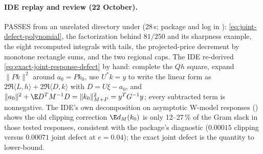 \paragraph{IDE replay and review (22 October).}  PASSES from an unrelated directory under  (28\,s; package and log in
): \eqref{eq:joint-defect-polynomial}, the factorization behind $81/250$ and its sharpness example, the eight recomputed integrals with tails,
the projected-price decrement by monotone rectangle sums, and the two regional caps. The IDE re-derived \eqref{eq:exact-joint-response-defect} by hand: complete the $Qh$ square,
expand $\|Pk\|^2$ around $a_0=Pk_0$, use $U^*k=y$ to write the linear form as $2\Re\langle L,h\rangle+2\Re\langle D,k\rangle$ with $D=U\xi-a_0$, and
$\|a_0\|^2+\E D^TM^{-1}D=\|k_0\|^2_{M+P}=y^TG^{-1}y$; every subtracted term is nonnegative. The IDE's own decomposition on asymptotic W-model responses
() shows the old clipping correction $\E d_M(k_0)$ is only 12--27\,\% of the Gram slack in those tested responses, consistent with the package's diagnostic
($0.00015$ clipping versus $0.00071$ joint defect at $e=0.04$); the exact joint defect is the quantity to lower-bound.
